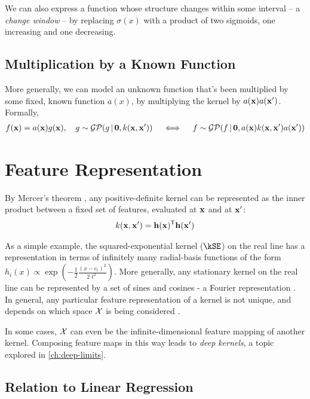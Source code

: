 We can also express a function whose structure changes within some interval -- a \emph{change window} -- by replacing $\sigma(x)$ with a product of two sigmoids, one increasing and one decreasing.

\subsection{Multiplication by a Known Function}

More generally, we can model an unknown function that's been multiplied by some fixed, known function $a(x)$, by multiplying the kernel by $a({\bf{x}}) a({\bf{x}}')$.
Formally,
%
\begin{align}
f({\bf{x}}) = a({\bf{x}}) g({\bf{x}}), \quad g \sim \mathcal{GP}\!\left(g \, \middle| \, {\bf{0}}, k({\bf{x}}, {\bf{x}}') \right) \quad
\iff
\quad f \sim \mathcal{GP}\!\left(f \, \middle| \, {\bf{0}},  a({\bf{x}}) k({\bf{x}}, {\bf{x}}') a({\bf{x}}') \right)
\end{align}




\section{Feature Representation}
%
By Mercer's theorem \citep{mercer1909functions},
any positive-definite kernel can be represented as the inner product between a fixed set of features, evaluated at ${\bf{x}}$ and at ${\bf{x}}'$:
%
\begin{align}
k({\bf{x}}, {\bf{x}}') = {\bf{h}}({\bf{x}})^{\mathsf{T}} {\bf{h}}({\bf{x}}')
\end{align}

As a simple example, the squared-exponential kernel ($\kSE$) on the real line has a representation in terms of infinitely many radial-basis functions of the form ${h_i(x) \propto \exp( -\frac{1}{2} \frac{(x - c_i)^2}{2\ell^2})}$.
More generally, any stationary kernel
on the real line can be represented by a set of sines and cosines - a Fourier representation \citep{bochner1959lectures}.
In general, any particular feature representation of a kernel is not unique, and depends on which space $\mathcal{X}$ is being considered \citep{minh2006mercer}.

In some cases, $\mathcal{X}$ can even be the infinite-dimensional feature mapping of another kernel.  Composing feature maps in this way leads to \emph{deep kernels}, a topic explored in \cref{ch:deep-limits}.



\subsection{Relation to Linear Regression}

